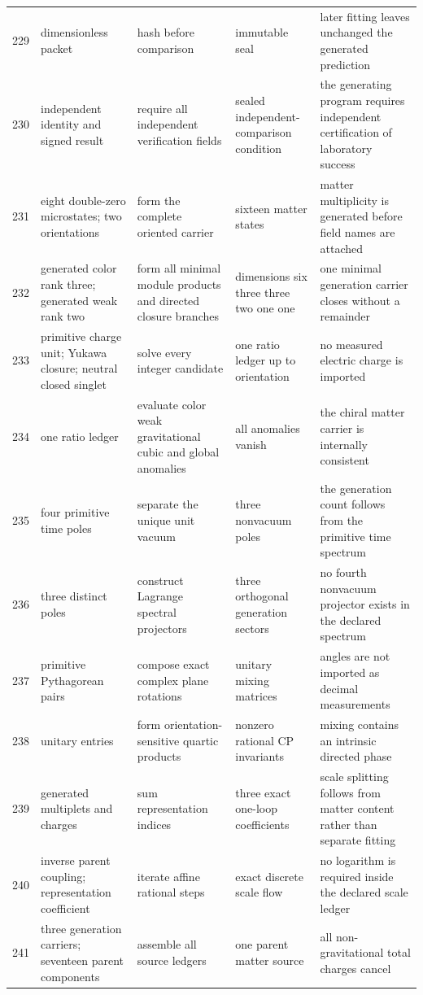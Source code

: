 \documentclass[11pt]{article}
\numberwithin{equation}{section}
\theoremstyle{remark}
\begin{document}
\begin{landscape}
\begin{longtable}{p{0.65cm}p{3.5cm}p{4.0cm}p{4.0cm}p{4.6cm}}
229&dimensionless packet&hash before comparison&immutable seal&later fitting leaves unchanged the generated prediction\\
230&independent identity and signed result&require all independent verification fields&sealed independent-comparison condition&the generating program requires independent certification of laboratory success\\
231&eight double-zero microstates; two orientations&form the complete oriented carrier&sixteen matter states&matter multiplicity is generated before field names are attached\\
232&generated color rank three; generated weak rank two&form all minimal module products and directed closure branches&dimensions six three three two one one&one minimal generation carrier closes without a remainder\\
233&primitive charge unit; Yukawa closure; neutral closed singlet&solve every integer candidate&one ratio ledger up to orientation&no measured electric charge is imported\\
234&one ratio ledger&evaluate color weak gravitational cubic and global anomalies&all anomalies vanish&the chiral matter carrier is internally consistent\\
235&four primitive time poles&separate the unique unit vacuum&three nonvacuum poles&the generation count follows from the primitive time spectrum\\
236&three distinct poles&construct Lagrange spectral projectors&three orthogonal generation sectors&no fourth nonvacuum projector exists in the declared spectrum\\
237&primitive Pythagorean pairs&compose exact complex plane rotations&unitary mixing matrices&angles are not imported as decimal measurements\\
238&unitary entries&form orientation-sensitive quartic products&nonzero rational CP invariants&mixing contains an intrinsic directed phase\\
239&generated multiplets and charges&sum representation indices&three exact one-loop coefficients&scale splitting follows from matter content rather than separate fitting\\
240&inverse parent coupling; representation coefficient&iterate affine rational steps&exact discrete scale flow&no logarithm is required inside the declared scale ledger\\
241&three generation carriers; seventeen parent components&assemble all source ledgers&one parent matter source&all non-gravitational total charges cancel\\

\end{longtable}
\end{landscape}
\end{document}

